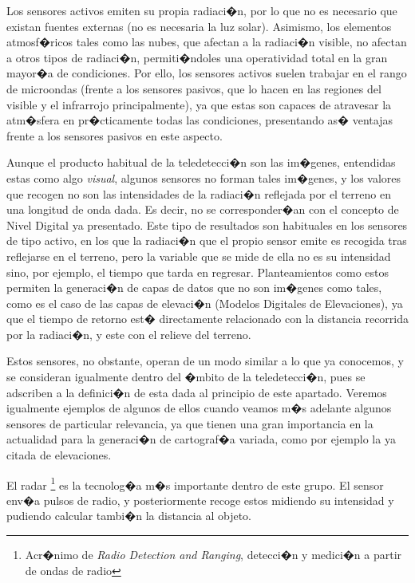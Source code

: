 Los sensores activos emiten su propia radiaci�n, por lo que no es necesario que existan fuentes externas (no es necesaria la luz solar). Asimismo, los elementos atmosf�ricos tales como las nubes, que afectan a la radiaci�n visible, no afectan a otros tipos de radiaci�n, permiti�ndoles una operatividad total en la gran mayor�a de condiciones. Por ello, los sensores activos suelen trabajar en el rango de microondas (frente a los sensores pasivos, que lo hacen en las regiones del visible y el infrarrojo principalmente), ya que estas son capaces de atravesar la atm�sfera en pr�cticamente todas las condiciones, presentando as� ventajas frente a los sensores pasivos en este aspecto.

Aunque el producto habitual de la teledetecci�n son las im�genes, entendidas estas como algo \emph{visual}, algunos sensores no forman tales im�genes, y los valores que recogen no son las intensidades de la radiaci�n reflejada por el terreno en una longitud de onda dada. Es decir, no se corresponder�an con el concepto de Nivel Digital ya presentado. Este tipo de resultados son habituales en los sensores de tipo activo, en los que la radiaci�n que el propio sensor emite es recogida tras reflejarse en el terreno, pero la variable que se mide de ella no es su intensidad sino, por ejemplo, el tiempo que tarda en regresar. Planteamientos como estos permiten la generaci�n de capas de datos que no son im�genes como tales, como es el caso de las capas de elevaci�n (Modelos Digitales de Elevaciones), ya que el tiempo de retorno est� directamente relacionado con la distancia recorrida por la radiaci�n, y este con el relieve del terreno.

Estos sensores, no obstante, operan de un modo similar a lo que ya conocemos, y se consideran igualmente dentro del �mbito de la teledetecci�n, pues se adscriben a la definici�n de esta dada al principio de este apartado. Veremos igualmente ejemplos de algunos de ellos cuando veamos m�s adelante algunos sensores de particular relevancia, ya que tienen una gran importancia en la actualidad para la generaci�n de cartograf�a variada, como por ejemplo la ya citada de elevaciones.

El radar \footnote{Acr�nimo de \emph{Radio Detection and Ranging}, detecci�n y medici�n a partir de ondas de radio} es la tecnolog�a m�s importante dentro de este grupo. El sensor env�a pulsos de radio, y posteriormente recoge estos midiendo su intensidad y pudiendo calcular tambi�n la distancia al objeto. 


